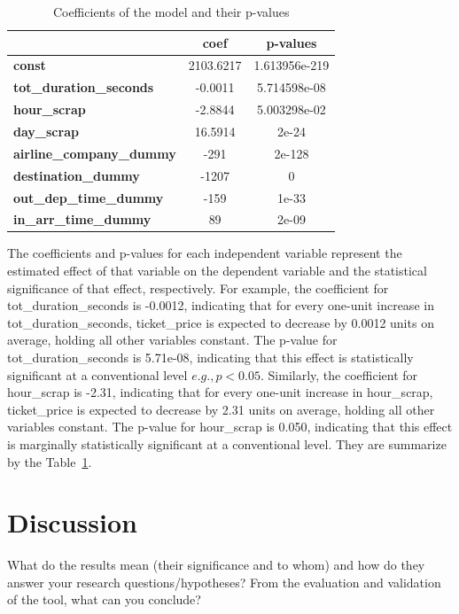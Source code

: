 \begin{table}[H]
  \centering
  \begin{tabular}{l c c}
  \hline
   & \textbf{coef} & \textbf{p-values} \\
  \hline
  \textbf{const} & 2103.6217 & 1.613956e-219 \\
  \textbf{tot\_duration\_seconds} & -0.0011 & 5.714598e-08 \\
  \textbf{hour\_scrap} & -2.8844 & 5.003298e-02 \\
  \textbf{day\_scrap} & 16.5914 & 2e-24\\
  \textbf{airline\_company\_dummy}&-291&2e-128\\
  \textbf{destination\_dummy}&-1207&0\\
  \textbf{out\_dep\_time\_dummy}&-159&1e-33\\
  \textbf{in\_arr\_time\_dummy}&89&2e-09\\
  \hline
  \end{tabular}
  \caption{Coefficients of the model and their p-values}
  \label{tab:my_tab1}
\end{table}

The coefficients and p-values for each independent variable represent the estimated effect of that variable on the dependent variable and the statistical significance of that effect, respectively.
For example, the coefficient for tot\_duration\_seconds is -0.0012, indicating that for every one-unit increase in tot\_duration\_seconds, ticket\_price is expected to decrease by 0.0012 units on average, holding all other variables constant.
The p-value for tot\_duration\_seconds is 5.71e-08, indicating that this effect is statistically significant at a conventional level \(e.g., p < 0.05\). 
Similarly, the coefficient for hour\_scrap is -2.31, indicating that for every one-unit increase in hour\_scrap,
ticket\_price is expected to decrease by 2.31 units on average, holding all other variables constant. 
The p-value for hour\_scrap is 0.050, indicating that this effect is marginally statistically significant at a conventional level.
They are summarize by the Table~\ref{tab:my_tab1}.




\section{Discussion}
\label{chap:discussion}
What do the results mean (their significance and to whom) and how do they answer your research questions/hypotheses? 
From the evaluation and validation of the tool, what can you conclude? 

